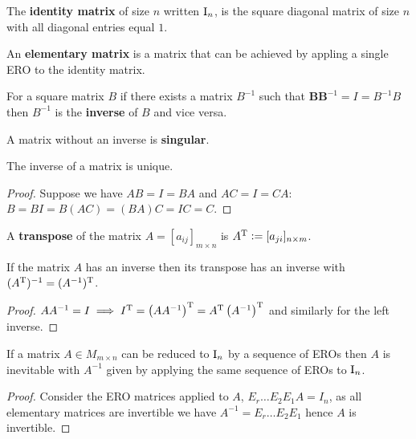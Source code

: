 \documentclass[../Year1.tex]{subfiles}
\begin{document}
\begin{definition}
    The \textbf{identity matrix} of size $n$ written $\mathrm{I}_{n}$, is the square diagonal matrix of size $n$ with all diagonal entries equal $1$.
\end{definition}

\begin{definition}
    An \textbf{elementary matrix} is a matrix that can be achieved by appling a single ERO to the identity matrix.
\end{definition}

\begin{definition}[Inverse]
    For a square matrix $B$ if there exists a matrix $B^{-1}$ such that $\textbf{BB}^{-1} = I = B^{-1}B$ then $B^{-1}$ is the \textbf{inverse} of $B$ and vice versa.
\end{definition}

\begin{definition}[Singular]
    A matrix without an inverse is \textbf{singular}.
\end{definition}

\begin{theorem}
    The inverse of a matrix is unique.
    \begin{proof}
        Suppose we have $AB=I=BA$ and $AC=I=CA$: $B = BI = B(AC) = (BA)C = IC = C$.
    \end{proof}
\end{theorem}

\begin{definition}
    A \textbf{transpose} of the matrix $A = [a_{ij}]_{m\times n}$ is  $A^{\mathrm{T}} := [a_{ji}]_{n\times m}$.
\end{definition}

\begin{theorem}
    If the matrix $A$ has an inverse then its transpose has an inverse with $(A^{\mathrm{T}})^{-1}=(A^{-1})^{\mathrm{T}}$. \begin{proof}
        $AA^{-1}=I \implies I^\T = \br{AA^{-1}}^\T=A^\T\br{A^{-1}}^\T$ and similarly for the left inverse.
    \end{proof}
\end{theorem}

\begin{theorem}
    If a matrix $A\in M_{m\times n}$ can be reduced to $\mathrm{I}_n$ by a sequence of EROs then $A$ is inevitable with $A^{-1}$ given by applying the same sequence of EROs to $\mathrm{I}_n$.
    \begin{proof}
        Consider the ERO matrices applied to $A$, $E_r\ldots E_2E_1A=I_n$, as all elementary matrices are invertible we have $A^{-1}=E_r\ldots E_2E_1$ hence $A$ is invertible.
    \end{proof}
\end{theorem}
\end{document}
